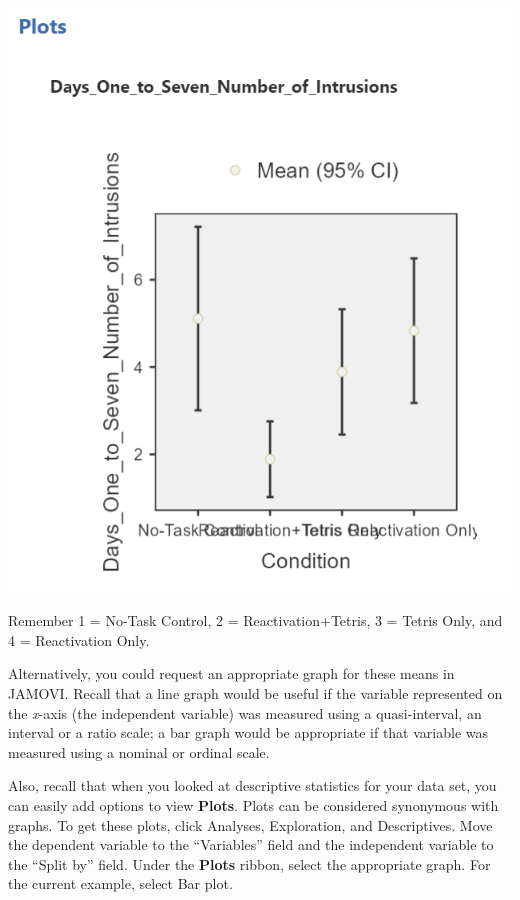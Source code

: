 \documentclass[
]{book}
\begin{document}
\includegraphics{img/OneWayANOVAResultsDescriptivePlot.png}

Remember 1 = No-Task Control, 2 = Reactivation+Tetris, 3 = Tetris Only, and 4 = Reactivation Only.

Alternatively, you could request an appropriate graph for these means in JAMOVI. Recall that a line graph would be useful if the variable represented on the \emph{x}-axis (the independent variable) was measured using a quasi-interval, an interval or a ratio scale; a bar graph would be appropriate if that variable was measured using a nominal or ordinal scale.

Also, recall that when you looked at descriptive statistics for your data set, you can easily add options to view \textbf{Plots}. Plots can be considered synonymous with graphs. To get these plots, click {Analyses}, {Exploration}, and {Descriptives}. Move the dependent variable to the ``Variables'' field and the independent variable to the ``Split by'' field. Under the \textbf{Plots} ribbon, select the appropriate graph. For the current example, select {Bar plot}.
\end{document}
